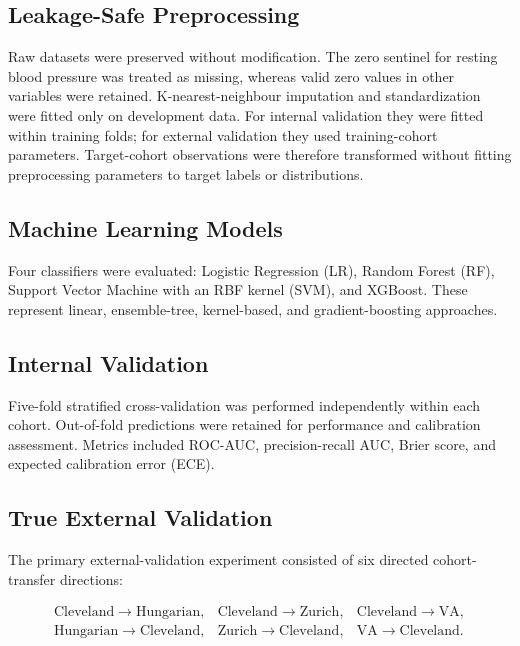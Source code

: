 \documentclass[10pt,journal,twocolumn]{IEEEtran}
\begin{document}
\subsection{Leakage-Safe Preprocessing}

Raw datasets were preserved without modification. The zero sentinel for resting blood pressure was treated as missing, whereas valid zero values in other variables were retained. K-nearest-neighbour imputation and standardization were fitted only on development data. For internal validation they were fitted within training folds; for external validation they used training-cohort parameters. Target-cohort observations were therefore transformed without fitting preprocessing parameters to target labels or distributions.

\subsection{Machine Learning Models}

Four classifiers were evaluated: Logistic Regression (LR), Random Forest (RF), Support Vector Machine with an RBF kernel (SVM), and XGBoost. These represent linear, ensemble-tree, kernel-based, and gradient-boosting approaches.

\subsection{Internal Validation}

Five-fold stratified cross-validation was performed independently within each cohort. Out-of-fold predictions were retained for performance and calibration assessment. Metrics included ROC-AUC, precision-recall AUC, Brier score, and expected calibration error (ECE).

\subsection{True External Validation}

The primary external-validation experiment consisted of six directed cohort-transfer directions:

\[
\begin{array}{lll}
\text{Cleveland}\rightarrow\text{Hungarian},&
\text{Cleveland}\rightarrow\text{Zurich},&
\text{Cleveland}\rightarrow\text{VA},\\
\text{Hungarian}\rightarrow\text{Cleveland},&
\text{Zurich}\rightarrow\text{Cleveland},&
\text{VA}\rightarrow\text{Cleveland}.
\end{array}
\]
\end{document}
